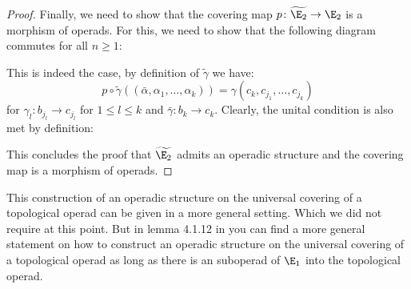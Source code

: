 \begin{proof}
    Finally, we need to show that the covering map $p \colon \widetilde{\E_2}\to \E_2$ is a morphism of operads.
    For this, we need to show that the following diagram commutes for all $n \geq 1$:
    \begin{center}
    \end{center}
    This is indeed the case, by definition of $\widetilde{\gamma}$ we have:
    \[
        p \circ \widetilde{\gamma} ((\bar{\alpha}, \alpha_1, \dots, \alpha_k)) = \gamma(c_k, c_{j_1}, \dots, c_{j_k})
    \]
    for $\gamma_l \colon b_{j_l} \to c_{j_l}$ for $1 \leq l \leq k$ and $\bar{\gamma} \colon b_k \to c_k$. Clearly, the unital condition is also met by definition:
    \begin{center}
    \end{center}
    This concludes the proof that $\widetilde{\E_2}$  admits an operadic structure and the covering map is a morphism of operads.
\end{proof}

\begin{rem}
    This construction of an operadic structure on the universal covering of a topological operad can be given in a more general setting.
    Which we did not require at this point. But in lemma 4.1.12 in \cite{adrian} you can find a more general statement on how to construct an 
    operadic structure on the universal covering of a topological operad as long as there is an suboperad of $\E_1$ into the topological operad.
\end{rem}
   
